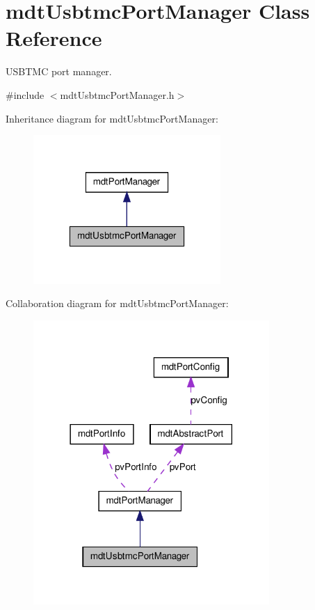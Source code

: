 \hypertarget{classmdt_usbtmc_port_manager}{
\section{mdtUsbtmcPortManager Class Reference}
\label{classmdt_usbtmc_port_manager}
}


USBTMC port manager.  




{\ttfamily \#include $<$mdtUsbtmcPortManager.h$>$}



Inheritance diagram for mdtUsbtmcPortManager:\nopagebreak
\begin{figure}[H]
\begin{center}
\leavevmode
\includegraphics[width=202pt]{classmdt_usbtmc_port_manager__inherit__graph}
\end{center}
\end{figure}


Collaboration diagram for mdtUsbtmcPortManager:\nopagebreak
\begin{figure}[H]
\begin{center}
\leavevmode
\includegraphics[width=254pt]{classmdt_usbtmc_port_manager__coll__graph}
\end{center}
\end{figure}
